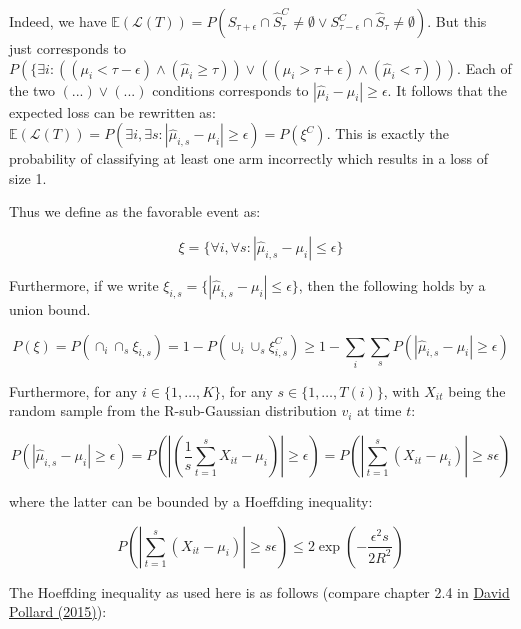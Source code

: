 \documentclass[12pt,]{article}
\begin{document}
Indeed, we have
\(\mathbb{E}(\mathcal{L}(T)) = P(S_{\tau + \epsilon} \cap \hat{S}_\tau^C \neq \emptyset \lor S_{\tau-\epsilon}^C \cap \hat{S}_{\tau} \neq \emptyset)\).
But this just corresponds to
\(P(\{\exists i: ((\mu_i < \tau-\epsilon) \land(\hat{\mu}_i \geq \tau)) \lor ((\mu_i > \tau + \epsilon) \land (\hat{\mu}_i < \tau)))\).
Each of the two \((...)\lor(...)\) conditions corresponds to
\(| \hat{\mu}_i - \mu_i | \geq \epsilon\). It follows that the expected
loss can be rewritten as:
\(\mathbb{E}(\mathcal{L}(T)) = P(\exists i, \exists s: |\hat{\mu}_{i,s} - \mu_i | \geq \epsilon) = P(\xi^C)\).
This is exactly the probability of classifying at least one arm
incorrectly which results in a loss of size 1.

Thus we define as the favorable event as:

\begin{equation} 
\xi = \{\forall i, \forall s: | \hat{\mu}_{i,s} - \mu_i | \leq
\epsilon\} 
\end{equation}

Furthermore, if we write
\(\xi_{i,s} = \{ |\hat{\mu}_{i,s}-\mu_i | \leq \epsilon \}\), then the
following holds by a union bound.

\begin{equation} 
P(\xi) = P(\cap_i \cap_s \xi_{i,s}) = 1 - P(\cup_i \cup_s
\xi_{i,s}^C) \geq 1 - \sum_i \sum_s P(| \hat{\mu}_{i,s} - \mu_i| \geq \epsilon)
\label{theorem2_prob_fav_event} 
\end{equation}

Furthermore, for any \(i \in \{1, \dots, K\}\), for any
\(s \in \{1, \dots, T(i)\}\), with \(X_{it}\) being the random sample
from the R-sub-Gaussian distribution \(v_i\) at time \(t\):

\begin{equation} 
P(| \hat{\mu}_{i,s} - \mu_i| \geq \epsilon) = P(| (\frac{1}{s}
\sum_{t=1}^{s} X_{it} - \mu_i) | \geq \epsilon) = P(| \sum_{t=1}^{s} (X_{it} -
\mu_i) | \geq s \epsilon) 
\end{equation}

where the latter can be bounded by a Hoeffding inequality:

\begin{equation} 
P(| \sum_{t=1}^{s} (X_{it} - \mu_i) | \geq s \epsilon) \leq
2\exp (-\frac{\epsilon^2 s}{2 R^2}) \label{theorem2_hoeffding} 
\end{equation}

The Hoeffding inequality as used here is as follows (compare chapter 2.4
in \href{http://www.stat.yale.edu/~pollard/Books/Mini/Basic.pdf}{David
Pollard (2015)}):
\end{document}
